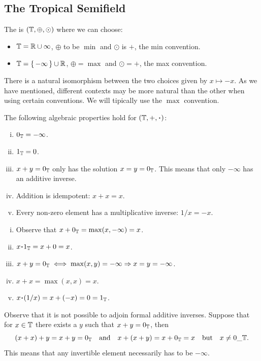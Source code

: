 \documentclass[12pt]{memoir}
\begin{document}
\subsection{The Tropical Semifield}

\begin{Def}
    The  is $(\mathbb{T},\oplus,\odot)$ where we can choose:
    \begin{itemize}
        \item $\mathbb{T}=\mathbb{R}\cup\infty$, $\oplus$ to be $\min$ and $\odot$ is $+$, the min convention.
        \item $\mathbb{T}=\{\,-\infty\,\}\cup\mathbb{R}$, $\oplus=\max$ and $\odot=+$, the max convention.
    \end{itemize}
\end{Def}

There is a natural isomorphism between the two choices given by $x\mapsto -x$. As we have mentioned, different contexts may be more natural than the other when using certain conventions. We will tipically use the $\max$ convention. 

\begin{Prop}
The following algebraic properties hold for $(\bT,+,\.)$:
\begin{enumerate}[i.]
    \item $0_{\mathbb{T}}=-\infty$.
    \item $1_{\mathbb{T}}=0$.
    \item $x+y=0_{\mathbb{T}}$ only has the solution $x=y=0_{\mathbb{T}}$. This means that only $-\infty$ has an additive inverse.
    \item Addition is idempotent: $x+x=x$.
    \item Every non-zero element has a multiplicative inverse: $1/x=-x$.
\end{enumerate}
\end{Prop}

\begin{ptcbp}
    \begin{enumerate}[i.]
    \item Observe that $x+0_{\mathbb{T}}=\max(x,-\infty)=x$.
    \item $x\.1_\bT=x+0=x$.
    \item $x+y=0_{\mathbb{T}}\iff \max(x,y)=-\infty\Rightarrow x=y=-\infty$.
    \item $x+x=\max(x,x)=x$.
    \item $x\.(1/x)=x+(-x)=0=1_\bT$.
\end{enumerate}
\end{ptcbp}
Observe that it is not possible to adjoin formal additive inverses. Suppose that for $x\in\mathbb{T}$ there exists a $y$ such that $x+y=0_{\mathbb{T}}$, then 
$$(x+x)+y=x+y=0_{\mathbb{T}}\quad\text{and}\quad x+(x+y)=x+0_{\mathbb{T}}=x\quad\text{but}\quad x\neq 0\_\mathbb{T}.$$
This means that any invertible element necessarily has to be $-\infty$.
\end{document}

